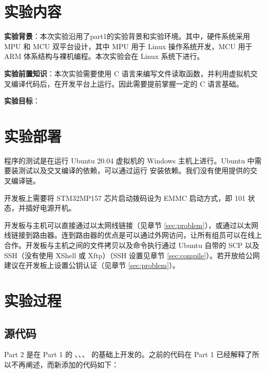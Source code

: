 
\section{实验内容}

\textbf{实验背景}：本次实验沿用了part1的实验背景和实验环境。其中，硬件系统采用 MPU 和 MCU 双平台设计，其中 MPU 用于 Linux 操作系统开发，MCU 用于 ARM 体系结构与裸机编程。本次实验会在 Linux 系统下进行。

\textbf{实验前置知识}：本次实验需要使用 C 语言来编写文件读取函数，并利用虚拟机交叉编译代码后，在开发平台上运行。因此需要提前掌握一定的 C 语言基础。

\textbf{实验目标}：



\section{实验部署}

程序的测试是在运行 Ubuntu 20.04 虚拟机的 Windows 主机上进行。Ubuntu 中需要装测试以及交叉编译的依赖，可以通过运行  安装依赖。我们没有使用提供的交叉编译链。

开发板上需要将 STM32MP157 芯片启动拨码设为 EMMC 启动方式，即 101 状态，并插好电源开机。

开发板与主机可以直接通过以太网线链接（见章节 \ref{sec:problem}），或通过以太网线链接到路由器。连到路由器的优点是可以通过外网访问，让所有组员可以在线上合作。开发板与主机之间的文件拷贝以及命令执行通过 Ubuntu 自带的 SCP 以及 SSH（没有使用 XShell 或 Xftp）（SSH 设置见章节 \ref{sec:compile}）。若开放给公网建议在开发板上设置公钥认证（见章节 \ref{sec:problem}）。

\section{实验过程}

\subsection{源代码}


Part 2 是在 Part 1 的 、、、 的基础上开发的。之前的代码在 Part 1 已经解释了所以不再阐述，而新添加的代码如下：

